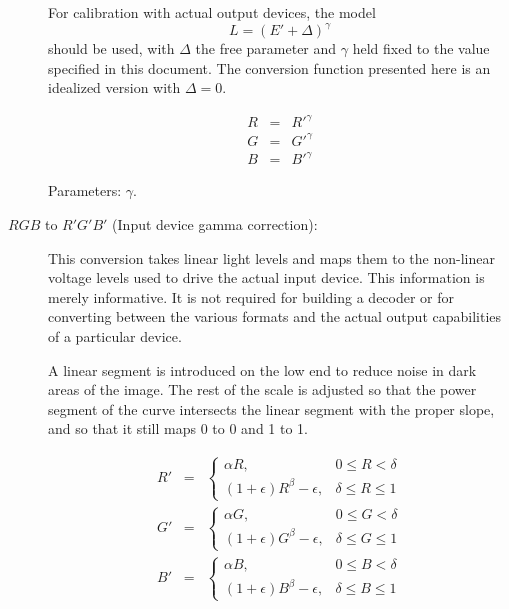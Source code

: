 \documentclass[11pt,letterpaper]{article}
\begin{document}
\begin{description}
For calibration with actual output devices, the model
\begin{displaymath}
L=(E'+\Delta)^\gamma
\end{displaymath}
 should be used, with $\Delta$ the free parameter and $\gamma$ held fixed to
 the value specified in this document.
The conversion function presented here is an idealized version with $\Delta=0$.

\begin{eqnarray*}
R & = & R'^\gamma \\
G & = & G'^\gamma \\
B & = & B'^\gamma
\end{eqnarray*}

Parameters: $\gamma$.

\item[$RGB$ to $R'G'B'$ (Input device gamma correction):]
\vspace{\baselineskip}\hfill


This conversion takes linear light levels and maps them to the non-linear
 voltage levels used to drive the actual input device.
This information is merely informative.
It is not required for building a decoder or for converting between the various
 formats and the actual output capabilities of a particular device.

A linear segment is introduced on the low end to reduce noise in dark areas of
 the image.
The rest of the scale is adjusted so that the power segment of the curve
 intersects the linear segment with the proper slope, and so that it still maps
 0 to 0 and 1 to 1.

\begin{eqnarray*}
R' & = & \left\{
\begin{array}{ll}
\alpha R,                     & 0\le R<\delta   \\
(1+\epsilon)R^\beta-\epsilon, & \delta\le R\le1
\end{array}\right. \\
G' & = & \left\{
\begin{array}{ll}
\alpha G,                     & 0\le G<\delta   \\
(1+\epsilon)G^\beta-\epsilon, & \delta\le G\le1
\end{array}\right. \\
B' & = & \left\{
\begin{array}{ll}
\alpha B,                     & 0\le B<\delta   \\
(1+\epsilon)B^\beta-\epsilon, & \delta\le B\le1
\end{array}\right.
\end{eqnarray*}


\end{description}
\end{document}
